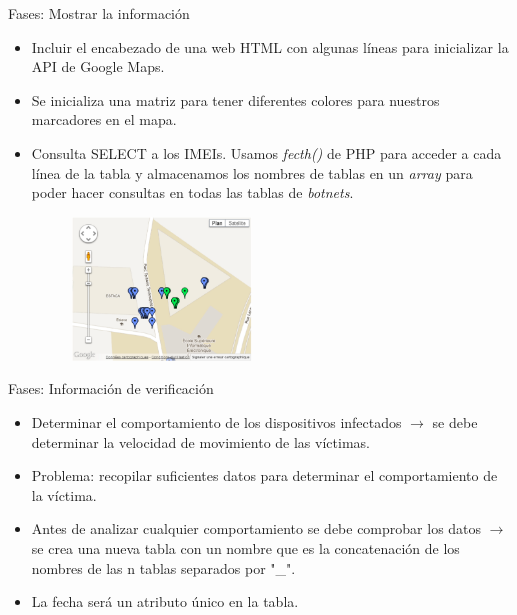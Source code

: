 \documentclass[aspectratio=43]{beamer}
\begin{document}
\begin{frame}{Fases: Mostrar la información}

\begin{itemize}

\item Incluir el encabezado de una web HTML con algunas líneas para inicializar la API de Google Maps.

\item Se inicializa una matriz para tener diferentes colores para nuestros marcadores en el mapa.

\item Consulta SELECT a los IMEIs. Usamos \emph{fecth()} de PHP para acceder a cada línea de la tabla y almacenamos los nombres de tablas en un \emph{array} para poder hacer consultas en todas las tablas de \emph{botnets}.


	\begin{figure}[htbp] 
	\begin{flushright} 
   \includegraphics[width=0.45\textwidth]{figuras/maps}  
  \label{maps}
  \end{flushright}
\end{figure}


\end{itemize}
  
\end{frame}

\begin{frame}{Fases: Información de verificación}

\begin{itemize}
\item Determinar el comportamiento de los dispositivos infectados $\rightarrow$ se debe determinar la velocidad de movimiento de las víctimas.

\item Problema: recopilar suficientes datos para determinar el comportamiento de la víctima.

\item Antes de analizar cualquier comportamiento se debe comprobar los datos $\rightarrow$ se crea una nueva tabla con un nombre que es la concatenación de los nombres de las n tablas separados por "\_". 

\item La fecha será un atributo único en la tabla.


\end{itemize}
  
\end{frame}
\end{document}
